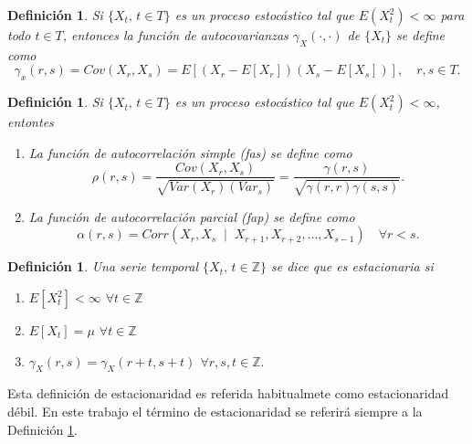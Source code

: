 \documentclass[12pt,twoside]{article}
\newtheorem{definition}[theorem]{Definición}
\begin{document}
\begin{definition}
    Si $\{X_t, \, t\in T\}$ es un proceso estocástico tal que $E(X_t^2)<\infty$ para todo $t\in T$, entonces la función de autocovarianzas $\gamma_X(\cdot, \cdot)$ de $\{X_t\}$ se define como
    \begin{equation}\label{eq:fun_autocov}
        \gamma_x(r,s) = Cov(X_r, X_s) = E[(X_r - E[X_r])(X_s-E[X_s])], \quad r,s \in T.
    \end{equation}
\end{definition}


\begin{definition}
     Si $\{X_t, \, t\in T\}$ es un proceso estocástico tal que $E(X_t^2)<\infty$, entontes
     \begin{enumerate}
         \item La función de autocorrelación simple (fas) se define como
         \begin{equation}\label{eq:ACF}
             \rho(r,s) = \frac{Cov(X_r, X_s)}{\sqrt{Var(X_r)(Var_s)}} = \frac{\gamma(r,s)}{\sqrt{\gamma(r,r) \gamma(s,s)}}.
         \end{equation}
         \item La función de autocorrelación parcial (fap) se define como
         \begin{equation}\label{eq:PACF}
             \alpha(r,s) = Corr(X_r, X_s \;\mid\; X_{r+1}, X_{r+2}, \dotsc, X_{s-1}) \quad \forall r < s.
         \end{equation}
     \end{enumerate}
\end{definition}

\begin{definition}\label{def:stationarity}
    Una serie temporal $\{X_t,\, t \in \mathbb{Z}\}$ se dice que es estacionaria si 
    \begin{enumerate}
        \item $E[X_t^2] <\infty$ $\forall t \in \mathbb{Z}$
        \item $E[X_t] = \mu$ $\forall t \in \mathbb{Z}$
        \item $\gamma_X(r,s) = \gamma_X(r+t, s+t)$ $\forall r,s,t \in \mathbb{Z}.$
    \end{enumerate}
\end{definition}

Esta definición de estacionaridad es referida habitualmete como estacionaridad débil. En este trabajo el término de estacionaridad se referirá siempre a la Definición \ref{def:stationarity}.
\end{document}
